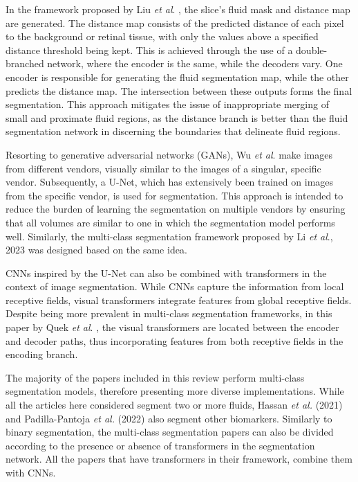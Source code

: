 \par
In the framework proposed by Liu \textit{et al}. \cite{Liu2021}, the  slice's fluid mask and distance map are generated. The distance map consists of the predicted distance of each pixel to the background or retinal tissue, with only the values above a specified distance threshold being kept. This is achieved through the use of a double-branched network, where the encoder is the same, while the decoders vary. One encoder is responsible for generating the fluid segmentation map, while the other predicts the distance map. The intersection between these outputs forms the final segmentation. This approach mitigates the issue of inappropriate merging of small and proximate fluid regions, as the distance branch is better than the fluid segmentation network in discerning the boundaries that delineate fluid regions.
\par
Resorting to generative adversarial networks (GANs), Wu \textit{et al}. \cite{Wu2023} make images from different vendors, visually similar to the images of a singular, specific vendor. Subsequently, a U-Net, which has extensively been trained on images from the specific vendor, is used for segmentation. This approach is intended to reduce the burden of learning the segmentation on multiple vendors by ensuring that all volumes are similar to one in which the segmentation model performs well. Similarly, the multi-class segmentation framework proposed by Li \textit{et al}., 2023 \cite{Li2023} was designed based on the same idea. 
\par
CNNs inspired by the U-Net can also be combined with transformers in the context of image segmentation. While CNNs capture the information from local receptive fields, visual transformers integrate features from global receptive fields. Despite being more prevalent in multi-class segmentation frameworks, in this paper by Quek \textit{et al}. \cite{Quek2022}, the visual transformers are located between the encoder and decoder paths, thus incorporating features from both receptive fields in the encoding branch.
\par
The majority of the papers included in this review perform multi-class segmentation models, therefore presenting more diverse implementations. While all the articles here considered segment two or more fluids, Hassan \textit{et al.} (2021) \cite{Hassan2021a} and Padilla-Pantoja \textit{et al.} (2022) \cite{Padilla2022} also segment other biomarkers. Similarly to binary segmentation, the multi-class segmentation papers can also be divided according to the presence \cite{Zhang2023, Liu2024} or absence \cite{Rahil2023, Hassan2021a, Sappa2021, Xing2022, Tang2022, Padilla2022, Hu2019, Mantel2021, Li2023, Gao2019, Hassan2021b, Lu2019} of transformers in the segmentation network. All the papers that have transformers in their framework, combine them with CNNs. 
